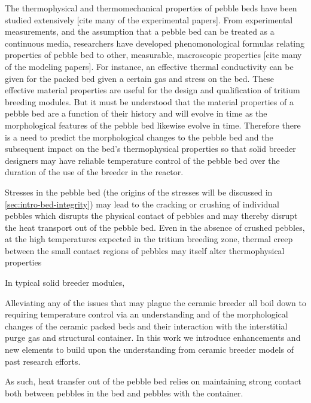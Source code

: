 The thermophysical and thermomechanical properties of pebble beds have been studied extensively [cite many of the experimental papers]. From experimental measurements, and the assumption that a pebble bed can be treated as a continuous media, researchers have developed phenomonological formulas relating properties of pebble bed to other, measurable, macroscopic properties [cite many of the modeling papers]. For instance, an effective thermal conductivity can be given for the packed bed given a certain gas and stress on the bed. These effective material properties are useful for the design and qualification of tritium breeding modules. But it must be understood that the material properties of a pebble bed are a function of their history and will evolve in time as the morphological features of the pebble bed likewise evolve in time. Therefore there is a need to predict the morphological changes to the pebble bed and the subsequent impact on the bed's thermophysical properties so that solid breeder designers may have reliable temperature control of the pebble bed over the duration of the use of the breeder in the reactor. 




Stresses in the pebble bed (the origins of the stresses will be discussed in \cref{sec:intro-bed-integrity}) may lead to the cracking or crushing of individual pebbles which disrupts the physical contact of pebbles and may thereby disrupt the heat transport out of the pebble bed. Even in the absence of crushed pebbles, at the high temperatures expected in the tritium breeding zone, thermal creep between the small contact regions of pebbles may itself alter thermophysical properties 

 

In typical solid breeder modules, 

Alleviating any of the issues that may plague the ceramic breeder all boil down to requiring temperature control via an understanding and of the morphological changes of the ceramic packed beds and their interaction with the interstitial purge gas and structural container. In this work we introduce enhancements and new elements to build upon the understanding from ceramic breeder models of past research efforts. 


As such, heat transfer out of the pebble bed relies on maintaining strong contact both between pebbles in the bed and pebbles with the container.

